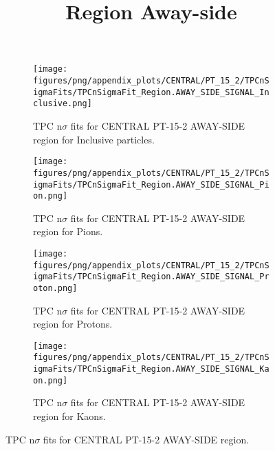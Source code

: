             \begin{figure}[H]
                \title{Region Away-side}
                \begin{subfigure}[b]{0.5\textwidth}
                    \centering
                    \texttt{[image: figures/png/appendix\_plots/CENTRAL/PT\_15\_2/TPCnSigmaFits/TPCnSigmaFit\_Region.AWAY\_SIDE\_SIGNAL\_Inclusive.png]}
                    \caption{TPC n$\sigma$ fits for CENTRAL PT-15-2 AWAY-SIDE region for Inclusive particles.}
                    \label{fig:appendix_CENTRAL_PT-15-2_AWAY_SIDE_SIGNAL_Inclusive}
                \end{subfigure}
                \begin{subfigure}[b]{0.5\textwidth}
                    \centering
                    \texttt{[image: figures/png/appendix\_plots/CENTRAL/PT\_15\_2/TPCnSigmaFits/TPCnSigmaFit\_Region.AWAY\_SIDE\_SIGNAL\_Pion.png]}
                    \caption{TPC n$\sigma$ fits for CENTRAL PT-15-2 AWAY-SIDE region for Pions.}
                    \label{fig:appendix_CENTRAL_PT-15-2_AWAY_SIDE_SIGNAL_Pion}
                \end{subfigure}
                \begin{subfigure}[b]{0.5\textwidth}
                    \centering
                    \texttt{[image: figures/png/appendix\_plots/CENTRAL/PT\_15\_2/TPCnSigmaFits/TPCnSigmaFit\_Region.AWAY\_SIDE\_SIGNAL\_Proton.png]}
                    \caption{TPC n$\sigma$ fits for CENTRAL PT-15-2 AWAY-SIDE region for Protons.}
                    \label{fig:appendix_CENTRAL_PT-15-2_AWAY_SIDE_SIGNAL_Proton}
                \end{subfigure}
                \begin{subfigure}[b]{0.5\textwidth}
                    \centering
                    \texttt{[image: figures/png/appendix\_plots/CENTRAL/PT\_15\_2/TPCnSigmaFits/TPCnSigmaFit\_Region.AWAY\_SIDE\_SIGNAL\_Kaon.png]}
                    \caption{TPC n$\sigma$ fits for CENTRAL PT-15-2 AWAY-SIDE region for Kaons.}
                    \label{fig:appendix_CENTRAL_PT-15-2_AWAY_SIDE_SIGNAL_Kaon}
                \end{subfigure}
                \caption{TPC n$\sigma$ fits for CENTRAL PT-15-2 AWAY-SIDE region.}
                \label{fig:appendix_CENTRAL_PT-15-2_AWAY_SIDE_SIGNAL}
            \end{figure}
